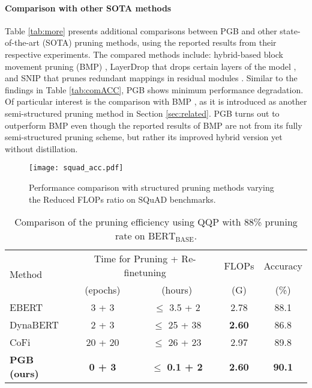 \paragraph{Comparison with other SOTA methods}
Table \ref{tab:more} presents additional comparisons between PGB and other state-of-the-art (SOTA) pruning methods, using the reported results from their respective experiments. The compared methods include: hybrid-based block movement pruning (BMP) \cite{block}, LayerDrop that drops certain layers of the model \cite{layer2}, and SNIP that prunes redundant mappings in residual modules \cite{TFsnip}. Similar to the findings in Table \ref{tab:comACC}, PGB shows minimum performance degradation. Of particular interest is the comparison with BMP \cite{block}, as it is introduced as another semi-structured pruning method in Section \ref{sec:related}. PGB turns out to outperform BMP even though the reported results of BMP are not from its fully semi-structured pruning scheme, but rather its improved hybrid version yet without distillation.
\begin{figure}[t!]
    \centering
    {\texttt{[image: squad\_acc.pdf]}}
    \caption{Performance comparison with structured pruning methods varying the Reduced FLOPs ratio on $\text{SQuAD}$ benchmarks.}
    \label{fig:squadacc}
\end{figure}
\begin{table*}[t!]
\centering
\begin{tabular}{l|c|c|c|c}
\toprule
\multirow{2}{*}{Method} & \multicolumn{2}{c|}{Time for Pruning + Re-finetuning}  & \multicolumn{1}{c|}{FLOPs} & \multicolumn{1}{c}{Accuracy} \\ \cmidrule(r){2-5}
 & (epochs)  &  (hours) & (G) & (\%) \\ 
\hline
EBERT \cite{ebert}      &  3 + 3       & $\leq$ 3.5 + 2        &    2.78    & 88.1 \\
DynaBERT \cite{DynaBERT}&  2 + 3        & $\leq$ 25 + 38        &    \textbf{2.60}   &   86.8  \\
CoFi \cite{Xia}     & 20 + 20           & $\leq$ 26 + 23        &    2.97    & 89.8 \\ \hline
 \textbf{PGB (ours)}& \textbf{0 + 3}  & $\leq$ \textbf{0.1 + 2} &    \textbf{2.60}  & \textbf{90.1} \\
\bottomrule
\end{tabular}
\caption{Comparison of the pruning efficiency using QQP with 88\% pruning rate on $\text{BERT}_{\text{BASE}}$.}
\label{time}
\end{table*}
